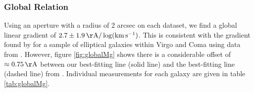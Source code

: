 		\subsubsection{Global Relation}
			Using an aperture with a radius of 2 arcsec on each dataset, we find a global linear gradient of $2.7\pm1.9 \,\mathrm{\AA/\log(km \, s^{-1})}$. This is consistent with the gradient found by \citet{Ziegler1997} for a sample of elliptical galaxies within Virgo and Coma using data from \citet{Dressler1987}. However, figure \ref{fig:globalMg} shows there is a considerable offset of $\approx0.75\,\mathrm{\AA}$ between our best-fitting line (solid line) and the best-fitting line (dashed line) from \citet{Ziegler1997}. Individual measurements for each galaxy are given in table \ref{tab:globalMg}.

